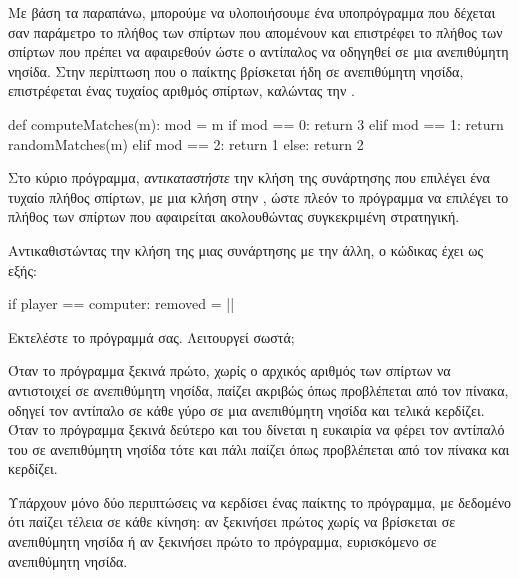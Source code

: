 \documentclass[a4paper,11pt,oneside]{book}
\begin{document}
\begin{step}
Με βάση τα παραπάνω, μπορούμε να υλοποιήσουμε ένα υποπρόγραμμα που δέχεται σαν παράμετρο το πλήθος  των σπίρτων που απομένουν και επιστρέφει το πλήθος των σπίρτων που πρέπει να αφαιρεθούν ώστε ο αντίπαλος να οδηγηθεί σε μια ανεπιθύμητη νησίδα. Στην περίπτωση που ο παίκτης βρίσκεται ήδη σε ανεπιθύμητη νησίδα, επιστρέφεται ένας τυχαίος αριθμός σπίρτων, καλώντας την . 

\begin{pycode}
def computeMatches(m):
    mod = m %
    if mod == 0:
        return 3
    elif mod == 1:
        return randomMatches(m)
    elif mod == 2:
        return 1  
    else:
        return 2
\end{pycode}
\end{step}

\begin{step}
Στο κύριο πρόγραμμα, \emph{αντικαταστήστε} την κλήση της συνάρτησης  που επιλέγει ένα τυχαίο πλήθος σπίρτων, με μια κλήση στην , ώστε πλεόν το πρόγραμμα να επιλέγει το πλήθος των σπίρτων που αφαιρείται ακολουθώντας συγκεκριμένη στρατηγική.

\begin{answer}
Αντικαθιστώντας την κλήση της μιας συνάρτησης με την άλλη, ο κώδικας έχει ως εξής:

\begin{pyplain}
    if player == computer:
        removed = ||
\end{pyplain}
\end{answer}

Εκτελέστε το πρόγραμμά σας. Λειτουργεί σωστά;

\begin{answer}
Όταν το πρόγραμμα ξεκινά πρώτο, χωρίς ο αρχικός αριθμός των σπίρτων να αντιστοιχεί σε ανεπιθύμητη νησίδα, παίζει ακριβώς όπως προβλέπεται από τον πίνακα, οδηγεί τον αντίπαλο σε κάθε γύρο σε μια ανεπιθύμητη νησίδα και τελικά κερδίζει. Όταν το πρόγραμμα ξεκινά δεύτερο και του δίνεται η ευκαιρία να φέρει τον αντίπαλό του σε ανεπιθύμητη νησίδα τότε και πάλι παίζει όπως προβλέπεται από τον πίνακα και κερδίζει.

Υπάρχουν μόνο δύο περιπτώσεις να κερδίσει ένας παίκτης το πρόγραμμα, με δεδομένο ότι παίζει τέλεια σε κάθε κίνηση: αν ξεκινήσει πρώτος χωρίς να βρίσκεται σε ανεπιθύμητη νησίδα ή αν ξεκινήσει πρώτο το πρόγραμμα, ευρισκόμενο σε ανεπιθύμητη νησίδα.
\end{answer}

\end{step}
\end{document}
